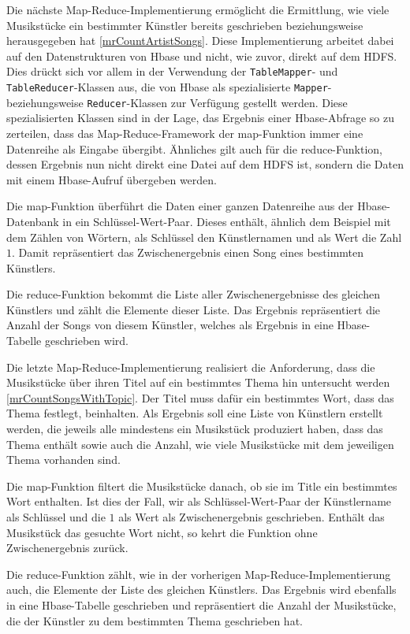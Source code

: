 Die nächste Map-Reduce-Implementierung  ermöglicht die Ermittlung, wie viele 
Musikstücke ein bestimmter Künstler bereits geschrieben beziehungsweise herausgegeben
hat \ref{mrCountArtistSongs}. Diese Implementierung arbeitet dabei auf den Datenstrukturen von Hbase und nicht,
wie zuvor, direkt auf dem HDFS. Dies drückt sich vor allem in der Verwendung der 
\texttt{TableMapper}- und \texttt{TableReducer}-Klassen aus, die von Hbase als spezialisierte \texttt{Mapper}- beziehungsweise \texttt{Reducer}-Klassen zur Verfügung gestellt werden.
Diese spezialisierten Klassen sind in der Lage, das Ergebnis einer Hbase-Abfrage so zu
zerteilen, dass das Map-Reduce-Framework der map-Funktion immer eine Datenreihe 
als Eingabe übergibt. Ähnliches gilt auch für die reduce-Funktion, dessen Ergebnis
nun nicht direkt eine Datei auf dem HDFS ist, sondern die Daten mit einem Hbase-Aufruf übergeben
werden.

Die map-Funktion überführt die Daten einer ganzen
Datenreihe aus der Hbase-Datenbank in ein Schlüssel-Wert-Paar. Dieses enthält, ähnlich 
dem Beispiel mit dem Zählen von Wörtern, als Schlüssel den Künstlernamen und als Wert
die Zahl $1$. Damit repräsentiert das Zwischenergebnis einen Song eines bestimmten Künstlers.

Die reduce-Funktion bekommt die Liste aller
Zwischenergebnisse des gleichen Künstlers und zählt die Elemente dieser Liste. Das Ergebnis
repräsentiert die Anzahl der Songs von diesem Künstler, welches als Ergebnis in eine 
Hbase-Tabelle geschrieben wird.


Die letzte Map-Reduce-Implementierung realisiert die Anforderung, dass die Musikstücke über
ihren Titel auf ein bestimmtes Thema hin untersucht werden \ref{mrCountSongsWithTopic}. Der Titel muss dafür ein bestimmtes
Wort, dass das Thema festlegt, beinhalten. Als Ergebnis soll eine Liste von Künstlern erstellt werden,
die jeweils alle mindestens ein Musikstück produziert haben, dass das Thema enthält sowie auch
die Anzahl, wie viele Musikstücke mit dem jeweiligen Thema vorhanden sind.

Die map-Funktion filtert die Musikstücke danach, ob sie im Title ein bestimmtes Wort enthalten.
Ist dies der Fall, wir als Schlüssel-Wert-Paar der Künstlername als Schlüssel und die $1$ als 
Wert als Zwischenergebnis geschrieben. Enthält das Musikstück das gesuchte Wort nicht,
so kehrt die Funktion ohne Zwischenergebnis zurück.

Die reduce-Funktion zählt, wie in der vorherigen Map-Reduce-Implementierung auch, die Elemente der Liste des gleichen Künstlers.
Das Ergebnis wird ebenfalls in eine Hbase-Tabelle geschrieben und repräsentiert die Anzahl der Musikstücke, die der
Künstler zu dem bestimmten Thema geschrieben hat.


